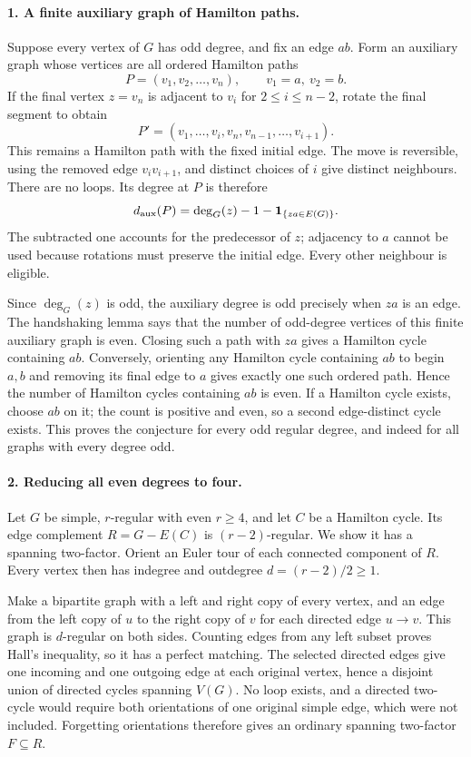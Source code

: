 \documentclass[11pt,a4paper]{article}
\begin{document}
\paragraph{1. A finite auxiliary graph of Hamilton paths.}
Suppose every vertex of $G$ has odd degree, and fix an edge $ab$.
Form an auxiliary graph whose vertices are all ordered Hamilton paths
\[
 P=(v_1,v_2,\ldots,v_n),\qquad v_1=a,\ v_2=b.
\]
If the final vertex $z=v_n$ is adjacent to $v_i$ for
$2\le i\le n-2$, rotate the final segment to obtain
\[
 P'=(v_1,\ldots,v_i,v_n,v_{n-1},\ldots,v_{i+1}).
\]
This remains a Hamilton path with the fixed initial edge. The move
is reversible, using the removed edge $v_iv_{i+1}$, and distinct
choices of $i$ give distinct neighbours. There are no loops. Its
degree at $P$ is therefore
\[
 d_{\rm aux}(P)=\deg_G(z)-1-\mathbf1_{\{za\in E(G)\}}.
\]
The subtracted one accounts for the predecessor of $z$; adjacency
to $a$ cannot be used because rotations must preserve the initial
edge. Every other neighbour is eligible.

Since $\deg_G(z)$ is odd, the auxiliary degree is odd precisely
when $za$ is an edge. The handshaking lemma says that the number
of odd-degree vertices of this finite auxiliary graph is even.
Closing such a path with $za$ gives a Hamilton cycle containing $ab$.
Conversely, orienting any Hamilton cycle containing $ab$ to begin
$a,b$ and removing its final edge to $a$ gives exactly one such
ordered path. Hence the number of Hamilton cycles containing $ab$
is even. If a Hamilton cycle exists, choose $ab$ on it; the count
is positive and even, so a second edge-distinct cycle exists. This
proves the conjecture for every odd regular degree, and indeed for
all graphs with every degree odd.

\paragraph{2. Reducing all even degrees to four.}
Let $G$ be simple, $r$-regular with even $r\ge4$, and let $C$ be
a Hamilton cycle. Its edge complement $R=G-E(C)$ is $(r-2)$-regular.
We show it has a spanning two-factor. Orient an Euler tour of each
connected component of $R$. Every vertex then has indegree and
outdegree $d=(r-2)/2\ge1$.

Make a bipartite graph with a left and right copy of every vertex,
and an edge from the left copy of $u$ to the right copy of $v$
for each directed edge $u\to v$. This graph is $d$-regular on both
sides. Counting edges from any left subset proves Hall's inequality,
so it has a perfect matching. The selected directed edges give one
incoming and one outgoing edge at each original vertex, hence a
disjoint union of directed cycles spanning $V(G)$. No loop exists,
and a directed two-cycle would require both orientations of one
original simple edge, which were not included. Forgetting orientations
therefore gives an ordinary spanning two-factor $F\subseteq R$.
\end{document}
